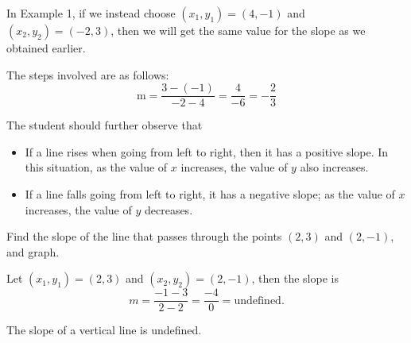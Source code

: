 In Example 1, if we instead choose \((x_1, y_1) = (4, -1)\) and \((x_2, y_2) = (-2, 3)\), then we will get the same value for the slope as we obtained earlier.

The steps involved are as follows:
\[
\text{m} = \frac{3 - (-1)}{-2 - 4} = \frac{4}{-6} = -\frac{2}{3}
\]

The student should further observe that
\begin{itemize}
    \item If a line rises when going from left to right, then it has a positive slope. In this situation, as the value of $x$ increases, the value of $y$ also increases.
    \item If a line falls going from left to right, it has a negative slope; as the value of $x$ increases, the value of $y$ decreases.
\end{itemize}

\begin{example}
Find the slope of the line that passes through the points $(2, 3)$ and $(2, -1)$, and graph.
\end{example}

\begin{solution} Let $(x_1, y_1) = (2, 3)$ and $(x_2, y_2) = (2, -1)$, then the slope is
\[ m = \frac{-1 - 3}{2 - 2} = \frac{-4}{0} = \text{undefined}.\]

\begin{center}
\end{center}

\end{solution}
\begin{note}
The slope of a vertical line is undefined.
\end{note}


